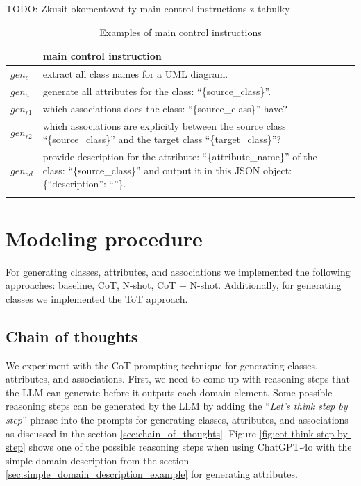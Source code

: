 \noindent{}TODO: Zkusit okomentovat ty main control instructions z tabulky

\begin{table}[!h]
    \scriptsize
    \centering
    \setlength{\tabcolsep}{0.5em}
\begin{tabular}{@{}l>{\raggedright\arraybackslash}p{}>{\raggedright\arraybackslash}p{}@{}}
         & main control instruction \\
    \toprule
    \addlinespace
    
$gen_c$ & extract all class names for a UML diagram. \\
\addlinespace

$gen_a$ & generate all attributes for the class: ``\{source\_class\}''. \\
\addlinespace

$gen_{r1}$ & which associations does the class: ``\{source\_class\}'' have? \\
\addlinespace

$gen_{r2}$ & which associations are explicitly between the source class ``\{source\_class\}'' and the target class ``\{target\_class\}''? \\
\addlinespace

$gen_{ad}$ & provide description for the attribute: ``\{attribute\_name\}'' of the class: ``\{source\_class\}'' and output it in this JSON object: \{``description'': ``''\}. \\
\addlinespace

	\bottomrule
	\addlinespace
	\end{tabular}
	\caption{Examples of main control instructions}
	\label{tab:main-control-instructions}
\end{table}


\section{Modeling procedure}

For generating classes, attributes, and associations we implemented the following approaches: baseline, CoT, N-shot, CoT + N-shot. Additionally, for generating classes we implemented the ToT approach.



\subsection{Chain of thoughts}

We experiment with the CoT prompting technique for generating classes, attributes, and associations. First, we need to come up with reasoning steps that the LLM can generate before it outputs each domain element. Some possible reasoning steps can be generated by the LLM by adding the ``\textit{Let's think step by step}'' phrase into the prompts for generating classes, attributes, and associations as discussed in the section \ref{sec:chain_of_thoughts}. Figure \ref{fig:cot-think-step-by-step} shows one of the possible reasoning steps when using ChatGPT-4o with the simple domain description from the section \ref{sec:simple_domain_description_example} for generating attributes.

